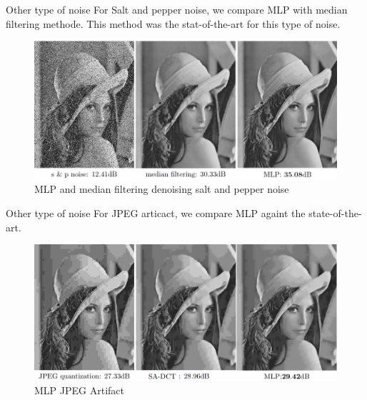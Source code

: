 \documentclass[8pt]{beamer}
\begin{document}
\begin{frame}{Other type of noise}
For Salt and pepper noise, we compare MLP with median filtering methode. This method was the stat-of-the-art for this type of noise.
\begin{figure}[H]
    \begin{center}
        \includegraphics[scale=0.45]{../datasets/images/saltandpeppernoise.png}
        \caption{MLP and median filtering denoising salt and pepper noise}
    \end{center}
\end{figure}

\end{frame}

\begin{frame}{Other type of noise}
    For JPEG articact, we compare MLP againt the state-of-the-art. 

    \begin{figure}[H]
        \begin{center}
            \includegraphics[scale=0.45]{../datasets/images/Jpgegnoise.png}
            \caption{MLP JPEG Artifact}
        \end{center}
    \end{figure}
    
    \end{frame}
\end{document}
